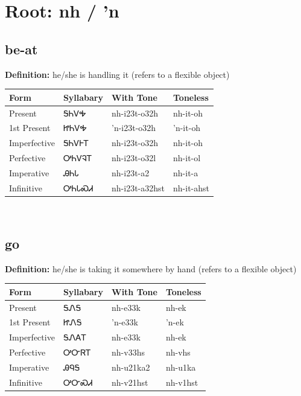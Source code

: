 \documentclass{article}%
\begin{document}
%
\normalsize%
\section*{Root: nh / 'n}%
\subsection*{be-at}%
\textbf{Definition: }%
he/she is handling it (refers to a flexible object)%
\\[0.5em]%
\begin{tabular}{|l|l|l|l|}%
\hline%
\textbf{Form}&\textbf{Syllabary}&\textbf{With Tone}&\textbf{Toneless}\\%
\hline%
Present&ᎦᏂᏙᎭ&nh{-}i23t{-}o32h&nh{-}it{-}oh\\%
1st Present&ᏥᏂᏙᎭ&'n{-}i23t{-}o32h&'n{-}it{-}oh\\%
Imperfective&ᎦᏂᏙᎰᎢ&nh{-}i23t{-}o32h&nh{-}it{-}oh\\%
Perfective&ᎤᏂᏙᎸᎢ&nh{-}i23t{-}o32l&nh{-}it{-}ol\\%
Imperative&ᎯᏂᏓ&nh{-}i23t{-}a2&nh{-}it{-}a\\%
Infinitive&ᎤᏂᏓᏍᏗ&nh{-}i23t{-}a32hst&nh{-}it{-}ahst\\%
\hline%
\end{tabular}%
\\[1em]%
\subsection*{go}%
\textbf{Definition: }%
he/she is taking it somewhere by hand (refers to a flexible object)%
\\[0.5em]%
\begin{tabular}{|l|l|l|l|}%
\hline%
\textbf{Form}&\textbf{Syllabary}&\textbf{With Tone}&\textbf{Toneless}\\%
\hline%
Present&ᎦᏁᎦ&nh{-}e33k&nh{-}ek\\%
1st Present&ᏥᏁᎦ&'n{-}e33k&'n{-}ek\\%
Imperfective&ᎦᏁᎪᎢ&nh{-}e33k&nh{-}ek\\%
Perfective&ᎤᏅᏒᎢ&nh{-}v33hs&nh{-}vhs\\%
Imperative&ᎯᏄᎦ&nh{-}u21ka2&nh{-}u1ka\\%
Infinitive&ᎤᏅᏍᏗ&nh{-}v21hst&nh{-}v1hst\\%
\hline%
\end{tabular}%
\\[1em]%
\end{document}
